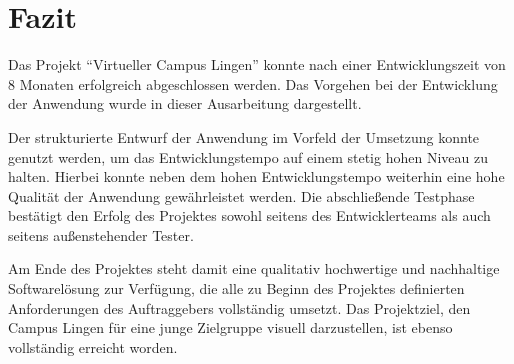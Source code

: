 \section{Fazit}
\label{sec:Fazit}

Das Projekt "`Virtueller Campus Lingen"' konnte nach einer Entwicklungszeit von
8 Monaten erfolgreich abgeschlossen werden. Das Vorgehen bei der Entwicklung der
Anwendung wurde in dieser Ausarbeitung dargestellt.

Der strukturierte Entwurf der Anwendung im Vorfeld der Umsetzung konnte genutzt
werden, um das Entwicklungstempo auf einem stetig hohen Niveau zu halten.
Hierbei konnte neben dem hohen Entwicklungstempo weiterhin eine hohe Qualität
der Anwendung gewährleistet werden. Die abschließende Testphase bestätigt den
Erfolg des Projektes sowohl seitens des Entwicklerteams als auch seitens
außenstehender Tester.

Am Ende des Projektes steht damit eine qualitativ hochwertige und nachhaltige
Softwarelösung zur Verfügung, die alle zu Beginn des Projektes definierten
Anforderungen des Auftraggebers vollständig umsetzt. Das Projektziel, den Campus
Lingen für eine junge Zielgruppe visuell darzustellen, ist ebenso vollständig
erreicht worden.